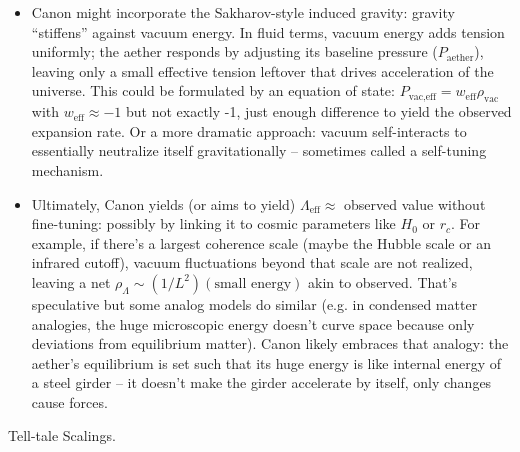 \documentclass[11pt]{article}
\begin{document}
\begin{itemize}
\item 
Canon might incorporate the Sakharov-style induced gravity: gravity “stiffens” against vacuum energy. In fluid terms, vacuum energy adds tension uniformly; the aether responds by adjusting its baseline pressure ($P_{\text{aether}}$), leaving only a small effective tension leftover that drives acceleration of the universe. This could be formulated by an equation of state: $P_{\text{vac,eff}} = w_{\text{eff}} \rho_{\text{vac}}$ with $w_{\text{eff}} \approx -1$ but not exactly -1, just enough difference to yield the observed expansion rate. Or a more dramatic approach: vacuum self-interacts to essentially neutralize itself gravitationally – sometimes called a self-tuning mechanism.




\item 
Ultimately, Canon yields (or aims to yield) $\Lambda_{\text{eff}} \approx$ observed value without fine-tuning: possibly by linking it to cosmic parameters like $H_0$ or $r_c$. For example, if there’s a largest coherence scale (maybe the Hubble scale or an infrared cutoff), vacuum fluctuations beyond that scale are not realized, leaving a net $\rho_{\Lambda} \sim (1/L^2)(\text{small energy})$ akin to observed. That’s speculative but some analog models do similar (e.g. in condensed matter analogies, the huge microscopic energy doesn’t curve space because only deviations from equilibrium matter). Canon likely embraces that analogy: the aether’s equilibrium is set such that its huge energy is like internal energy of a steel girder – it doesn’t make the girder accelerate by itself, only changes cause forces.




\end{itemize}

Tell-tale Scalings.
\end{document}
